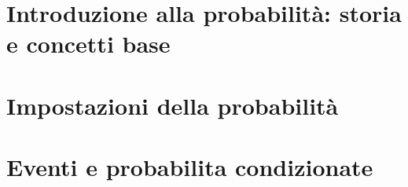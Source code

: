 \documentclass{article}
\begin{document}
\newgeometry{}

\tableofcontents
\restoregeometry

\section{Introduzione alla probabilità: storia e concetti base}


\section{Impostazioni della probabilità}


\section{Eventi e probabilita condizionate}

\end{document}
